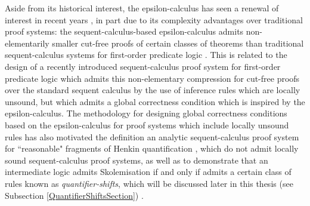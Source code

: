 \documentclass[10pt]{article}
\theoremstyle{definition}\newtheorem{remark}[theorem]{Remark}
\theoremstyle{definition}\newtheorem{example}[theorem]{Example}
\theoremstyle{definition}\newtheorem{definition}[theorem]{Definition}
\begin{document}
	Aside from its historical interest, the epsilon-calculus has seen a renewal of interest in recent years \cite{MiyamotoMoserEpsilonEquality, MoserZachEpsilonCalculusAndHerbrand, BaazEpsilon, BaazLolicEpsilonShorterProofs, AraiEpsilonId1, MintsEpsilonFirstSecond}, in part due to its complexity advantages over traditional proof systems: the sequent-calculus-based epsilon-calculus admits non-elementarily smaller cut-free proofs of certain classes of theorems than traditional sequent-calculus systems for first-order predicate logic \cite{BaazLolicEpsilonShorterProofs}. This is related to the design of a recently introduced sequent-calculus proof system for first-order predicate logic \cite{BaazUnsoundInferences} which admits this non-elementary compression for cut-free proofs over the standard sequent calculus by the use of inference rules which are locally unsound, but which admits a global correctness condition which is inspired by the epsilon-calculus. The methodology for designing global correctness conditions based on the epsilon-calculus for proof systems which include locally unsound rules has also motivated the definition an analytic sequent-calculus proof system for ``reasonable" fragments of Henkin quantification \cite{BaazLolicHenkin}, which do not admit locally sound sequent-calculus proof systems, as well as to demonstrate that an intermediate logic admits Skolemisation if and only if admits a certain class of rules known as \textit{quantifier-shifts}, which will be discussed later in this thesis (see Subsection \ref{QuantifierShiftsSection}) \cite{BaazSkolemisationIntermediateLogics}.
	
\end{document}

